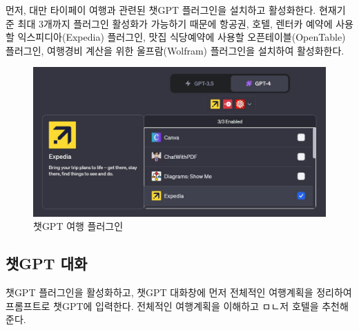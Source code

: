 \documentclass[
  letterpaper,
]{book}
\begin{document}
먼저, 대만 타이페이 여행과 관련된 챗GPT 플러그인을 설치하고 활성화한다.
현재기준 최대 3개까지 플러그인 활성화가 가능하기 때문에 항공권, 호텔,
렌터카 예약에 사용할 익스피디아(Expedia) 플러그인, 맛집 식당예약에
사용할 오픈테이블(OpenTable) 플러그인, 여행경비 계산을 위한
울프람(Wolfram) 플러그인을 설치하여 활성화한다.

\begin{figure}

{\centering \includegraphics[width=6.70833in,height=\textheight]{images/travel_plugin.jpg}

}

\caption{챗GPT 여행 플러그인}

\end{figure}

\hypertarget{uxcc57gpt-uxb300uxd654}{%
\subsection{챗GPT 대화}\label{uxcc57gpt-uxb300uxd654}}

챗GPT 플러그인을 활성화하고, 챗GPT 대화창에 먼저 전체적인 여행계획을
정리하여 프롬프트로 챗GPT에 입력한다. 전체적인 여행계획을 이해하고
ㅁㄴ저 호텔을 추천해준다.
\end{document}
